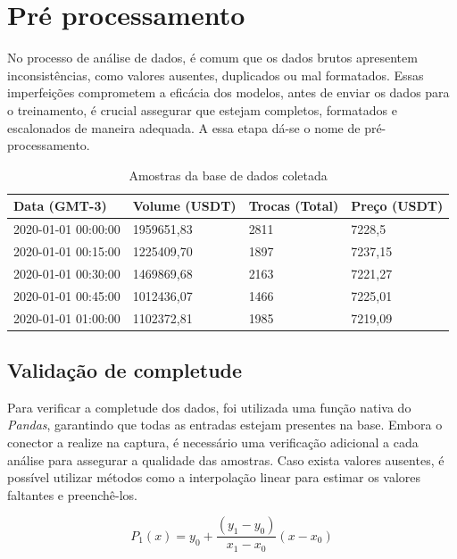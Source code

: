 \section{Pré processamento} \label{sec:preprocessamento}
No processo de análise de dados, é comum que os dados brutos apresentem inconsistências, como valores ausentes, duplicados ou mal formatados. 
Essas imperfeições comprometem a eficácia dos modelos, antes de enviar os dados para o treinamento, é crucial assegurar que estejam completos, formatados e escalonados de maneira adequada.
A essa etapa dá-se o nome de pré-processamento.

\begin{table}[!htb]
    \caption{Amostras da base de dados coletada} \label{tab:amostras}
    \begin{tabularx}{\textwidth}{X|X|X|X}
    \hline
    Data (GMT-3) & Volume (USDT) & Trocas (Total) & Preço (USDT) \\ \hline
    2020-01-01 00:00:00   & 1959651,83      & 2811            & 7228,5         \\ \hline
    2020-01-01 00:15:00   & 1225409,70      & 1897            & 7237,15        \\ \hline
    2020-01-01 00:30:00   & 1469869,68      & 2163            & 7221,27        \\ \hline
    2020-01-01 00:45:00   & 1012436,07      & 1466            & 7225,01        \\ \hline
    2020-01-01 01:00:00   & 1102372,81      & 1985            & 7219,09        \\ \hline
    \end{tabularx}
\end{table}

\subsection{Validação de completude} \label{sec:completude}
Para verificar a completude dos dados, foi utilizada uma função nativa do \textit{Pandas}, garantindo que todas as entradas estejam presentes na base.
Embora o conector a realize na captura, é necessário uma verificação adicional a cada análise para assegurar a qualidade das amostras. 
Caso exista valores ausentes, é possível utilizar métodos como a interpolação linear para estimar os valores faltantes e preenchê-los.

\begin{equation} 
    {P_1(x) = y_0 + \frac{(y_1 - y_0)}{x_1 - x_0} (x - x_0)}
    \label{eq:interpolacao} 
\end{equation}

